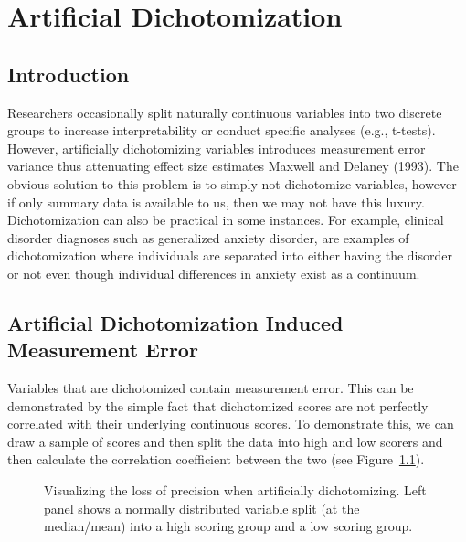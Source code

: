 \documentclass[
  letterpaper,
  DIV=11,
  numbers=noendperiod]{scrreprt}
\begin{document}

\chapter{Artificial Dichotomization}\label{sec-dichotomization}

\section{Introduction}\label{introduction-4}

Researchers occasionally split naturally continuous variables into two
discrete groups to increase interpretability or conduct specific
analyses (e.g., t-tests). However, artificially dichotomizing variables
introduces measurement error variance thus attenuating effect size
estimates Maxwell and Delaney (1993). The obvious solution to this
problem is to simply not dichotomize variables, however if only summary
data is available to us, then we may not have this luxury.
Dichotomization can also be practical in some instances. For example,
clinical disorder diagnoses such as generalized anxiety disorder, are
examples of dichotomization where individuals are separated into either
having the disorder or not even though individual differences in anxiety
exist as a continuum.

\section{Artificial Dichotomization Induced Measurement
Error}\label{artificial-dichotomization-induced-measurement-error}

Variables that are dichotomized contain measurement error. This can be
demonstrated by the simple fact that dichotomized scores are not
perfectly correlated with their underlying continuous scores. To
demonstrate this, we can draw a sample of scores and then split the data
into high and low scorers and then calculate the correlation coefficient
between the two (see Figure~\ref{fig-dich}).

\begin{figure}[H]


\caption{\label{fig-dich}Visualizing the loss of precision when
artificially dichotomizing. Left panel shows a normally distributed
variable split (at the median/mean) into a high scoring group and a low
scoring group.}

\end{figure}%
\end{document}
